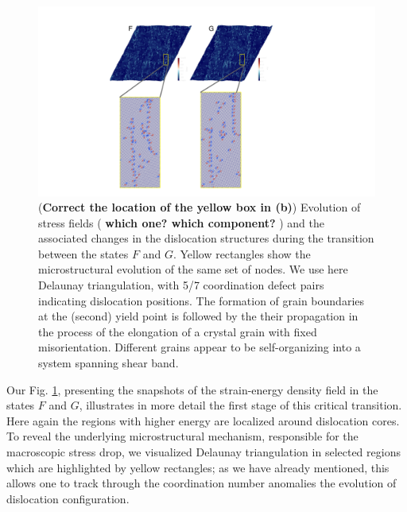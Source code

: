 \documentclass[aps,
superscriptaddress,notitlepage]{revtex4-1}
\begin{document}
\begin{figure}[h!]
\includegraphics[scale=.35]{figures_ordering/figure_13.pdf}
\caption{(\textbf{Correct the location of the yellow box in (b)}) Evolution of stress fields ( \textbf{which one? which component?} ) and the associated changes in the dislocation structures during the transition  between the states $F$ and $G$.  Yellow rectangles show  the microstructural evolution of the same set of nodes. We use here  Delaunay triangulation, with 5/7 coordination defect pairs indicating dislocation positions. The formation of grain boundaries at the (second) yield point   is followed by the their propagation  in the process of the elongation of a crystal grain with fixed misorientation. Different grains appear to be  self-organizing into a system spanning shear band.}
\label{fig:3}
\end{figure}

 Our Fig. \ref{fig:3}, presenting  the snapshots of the strain-energy density field  in the states  $F$ and $G$,  illustrates in more detail the first stage of this critical transition.   Here again the  regions with higher energy  are  localized around dislocation cores. To reveal the underlying microstructural mechanism, responsible for the macroscopic stress drop, we  visualized Delaunay triangulation in selected regions which are   highlighted by yellow rectangles;  as we have already mentioned,  this  allows one  to track  through  the coordination number anomalies  the evolution of   dislocation configuration. 
 
\end{document}
